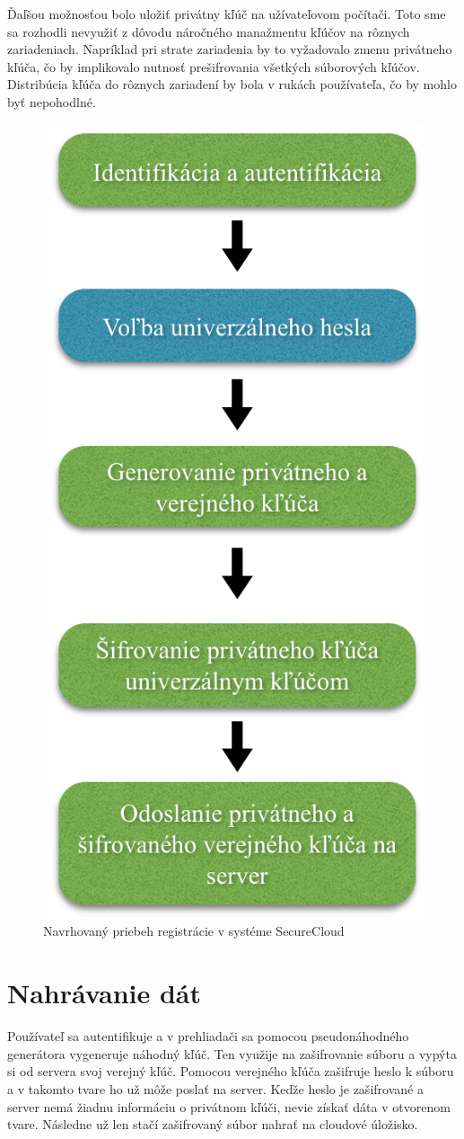 		Ďaľšou možnosťou bolo uložiť privátny kľúč na užívateľovom počítači. Toto sme sa rozhodli nevyužiť z dôvodu náročného manažmentu kľúčov na rôznych zariadeniach. Napríklad pri strate zariadenia by to vyžadovalo zmenu privátneho kľúča, čo by implikovalo nutnosť prešifrovania všetkých súborových kľúčov. Distribúcia kľúča do rôznych zariadení by bola v rukách používateľa, čo by mohlo byť nepohodlné.
		
		
		\begin{figure}[H]
			\begin{center}
				\includegraphics[width=0.5\linewidth]{images/registracia.png}
				\caption{Navrhovaný priebeh registrácie v systéme SecureCloud}
			\end{center}
		\end{figure}
	
	\section{Nahrávanie dát}
	
		Používateľ sa autentifikuje a v prehliadači sa pomocou pseudonáhodného generátora vygeneruje náhodný kľúč. Ten využije na zašifrovanie súboru a vypýta si od servera svoj verejný kľúč. Pomocou verejného kľúča zašifruje heslo k súboru a v takomto tvare ho už môže poslať na server. Keďže heslo je zašifrované a server nemá žiadnu informáciu o privátnom kľúči, nevie získať dáta v otvorenom tvare. Následne už len stačí zašifrovaný súbor nahrať na cloudové úložisko.
		
